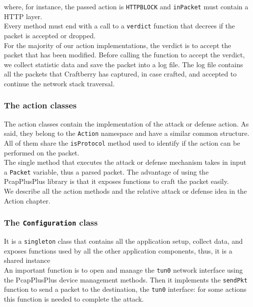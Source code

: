 \documentclass[12pt]{article}
\begin{document}
	where, for instance, the passed action is \lstinline{HTTPBLOCK} and \lstinline{inPacket} must contain a HTTP layer.\\
	Every method must end with a call to a \lstinline{verdict} function that decrees if the packet is accepted or dropped.\\
	For the majority of our action implementations, the verdict is to accept the packet that has been modified. Before calling the function to accept the verdict, we collect statistic data and save the packet into a log file. The log file contains all the packets that Craftberry has captured, in case crafted, and accepted to continue the network stack traversal.

	\subsubsection{The action classes}

	The action classes contain the implementation of the attack or defense action. As said, they belong to the \lstinline{Action} namespace and have a similar common structure. All of them share the \lstinline{isProtocol} method used to identify if the action can be performed on the packet.\\
	The single method that executes the attack or defense mechanism takes in input a \lstinline{Packet} variable, thus a parsed packet. The advantage of using the PcapPlusPlus library is that it exposes functions to craft the packet easily.\\
	\bigbreak
	We describe all the action methods and the relative attack or defense idea in the Action chapter.

	\subsubsection{The \lstinline{Configuration} class}
	
	It is a \lstinline{singleton} class that contains all the application setup, collect data, and exposes functions used by all the other application components, thus, it is a shared instance\\
	\bigbreak
	An important function is to open and manage the \lstinline{tun0} network interface using the PcapPlusPlus device management methods. Then it implements the \lstinline{sendPkt} function to send a packet to the destination, the \lstinline{tun0} interface: for some actions this function is needed to complete the attack.\\
	
\end{document}
